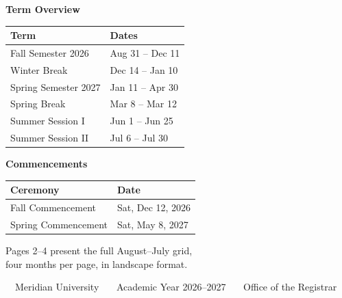\documentclass[10pt]{article}
\newcommand{\footerbar}{%
\vfill
\begin{center}
{\scriptsize\textcolor{inknavy!75}{\faCalendar\ \ Meridian University \ \textbullet\ \ Academic Year 2026--2027 \ \textbullet\ \ Office of the Registrar}}
\end{center}
}
\begin{document}
\begin{minipage}[t]{0.42\linewidth}
{\large\bfseries\textcolor{inknavy}{Term Overview}}\\[2mm]
\small
\begin{tabular}{@{}l l@{}}
\toprule
\textbf{Term} & \textbf{Dates} \\
\midrule
Fall Semester 2026 & Aug 31 -- Dec 11 \\
Winter Break & Dec 14 -- Jan 10 \\
Spring Semester 2027 & Jan 11 -- Apr 30 \\
Spring Break & Mar 8 -- Mar 12 \\
Summer Session I & Jun 1 -- Jun 25 \\
Summer Session II & Jul 6 -- Jul 30 \\
\bottomrule
\end{tabular}

\vspace{6mm}
{\large\bfseries\textcolor{inknavy}{Commencements}}\\[2mm]
\small
\begin{tabular}{@{}l l@{}}
\toprule
\textbf{Ceremony} & \textbf{Date} \\
\midrule
Fall Commencement & Sat, Dec 12, 2026 \\
Spring Commencement & Sat, May 8, 2027 \\
\bottomrule
\end{tabular}

\vspace{6mm}
\small\textcolor{inknavy!70}{Pages 2--4 present the full August--July grid,\\
four months per page, in landscape format.}
\end{minipage}

\footerbar

\newpage
\end{document}
